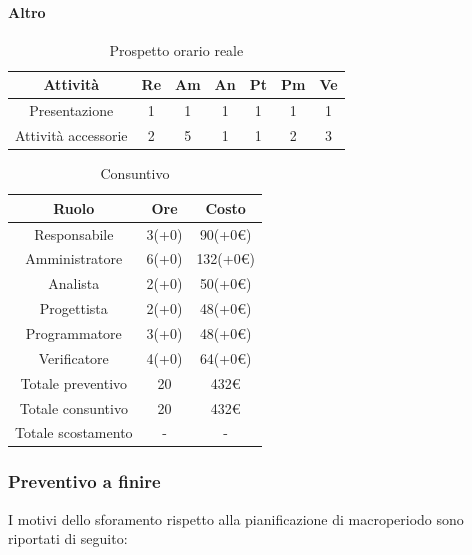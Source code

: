 \paragraph{Altro}
\begin{table}[H]
	\centering
	\begin{tabular}{|c|c|c|c|c|c|c|}
		\hline
		\rowcolor{lighter-grayer}
		\textbf{Attività} & \textbf{Re}        & \textbf{Am}        & \textbf{An}        & \textbf{Pt}        & \textbf{Pm}        & \textbf{Ve}        \\ \hline
		
		Presentazione       & 1           & 1           & 1           & 1           & 1           & 1           \\ \hline
		Attività accessorie & 2           & 5           & 1           & 1           & 2           & 3           \\ \hline
		
	\end{tabular}
	\caption{ Prospetto orario reale\\}
\end{table}

\begin{table}[H]
	\centering
	\renewcommand{\arraystretch}{1.5}
	\begin{tabular}{|c|c|c|}
		\hline
		\rowcolor{lighter-grayer}
		Ruolo & Ore & Costo \\ \hline
		Responsabile & 3(+0) & 90(+0\euro) \\ \hline
		Amministratore & 6(+0) & 132(+0\euro) \\ \hline
		Analista & 2(+0) & 50(+0\euro) \\ \hline
		Progettista & 2(+0) & 48(+0\euro) \\ \hline
		Programmatore & 3(+0) & 48(+0\euro) \\ \hline
		Verificatore & 4(+0) & 64(+0\euro) \\ \hline
		Totale preventivo & 20 & 432\euro \\ \hline
		Totale consuntivo & 20 & 432\euro \\ \hline
		Totale scostamento & - & - \\ \hline
	\end{tabular}
	\caption{ Consuntivo\\}
\end{table}

\subsubsection{Preventivo a finire}
I motivi dello sforamento rispetto alla pianificazione di macroperiodo sono riportati di seguito:

